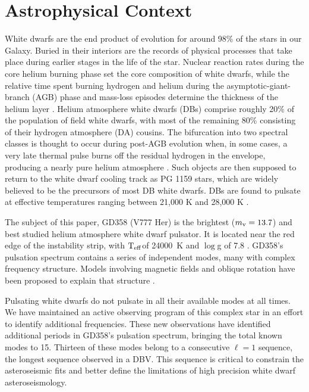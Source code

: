 \documentclass[12pt,preprint]{aastex}
\newcommand{\teff}{$\rm T_{eff}$}
\newcommand{\logg}{$\log$g }
\begin{document}

\section{Astrophysical Context}
\label{intro}
White dwarfs are the end product of evolution for around 98\% of the stars in our Galaxy. 
Buried in their interiors are the records of physical processes that take place during 
earlier stages in the life of the star. Nuclear reaction rates during the core helium 
burning phase set the core composition of white dwarfs, while the relative time spent 
burning hydrogen and helium during the asymptotic-giant-branch (AGB) phase and mass-loss 
episodes determine the thickness of the helium layer \citep{Lawlor06,Althaus05}. Helium 
atmosphere white dwarfs (DBs) comprise roughly 20\% of the population of field white 
dwarfs, with most of the remaining 80\% consisting of their hydrogen atmosphere (DA) 
cousins. The bifurcation into two spectral classes is thought to occur during post-AGB 
evolution when, in some cases, a very late thermal pulse burns off the residual hydrogen 
in the envelope, producing a nearly pure helium atmosphere \citep{Iben83}. Such objects 
are then supposed to return to the white dwarf cooling track as PG 1159 stars, which are 
widely believed to be the precursors of most DB white dwarfs. DBs are found to pulsate at 
effective temperatures ranging between 21,000 K and 28,000 K \citep{Beauchamp99, Castanheira05}. 

The subject of this paper, GD358 (V777 Her) is the brightest ($m_{\rm v}=13.7$) and best 
studied helium atmosphere white dwarf pulsator. It is located near the red edge of the 
instability strip, with \teff of 24000~K and \logg of 7.8 \citep{Koester2013}. GD358's 
pulsation spectrum contains a series of independent modes, many with complex 
frequency structure.  Models involving magnetic fields and oblique rotation have been 
proposed to explain that structure \citep{Montgomery10}.

Pulsating white dwarfs do not pulsate in all their available modes at all times.  
We have maintained an active observing program of this complex star in an effort 
to identify additional frequencies. These new observations have identified additional 
periods in GD358's pulsation spectrum, bringing the total known modes to 15. Thirteen of 
these modes belong to a consecutive $\ell=1$ sequence, the longest sequence observed 
in a DBV. This sequence is critical to constrain the asteroseismic fits and better define the
limitations of high precision white dwarf asteroseismology. 
\end{document}
